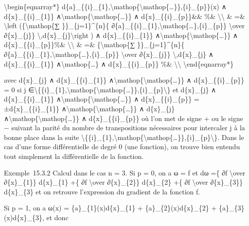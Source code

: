 \documentclass[]{article}
\begin{document}
\textbackslash{}begin\{eqnarray*\}
d\{a\}\_\{\{i\}\_\{1\},\textbackslash{}mathop\{\textbackslash{}mathop\{\ldots{}\}\},\{i\}\_\{p\}\}(x)
∧ d\{x\}\_\{\{i\}\_\{1\}\}
∧\textbackslash{}mathop\{\textbackslash{}mathop\{\ldots{}\}\} ∧
d\{x\}\_\{\{i\}\_\{p\}\}\&\& \%\& \textbackslash{}\textbackslash{} \&
=\& \textbackslash{}left (\{\textbackslash{}mathop\{∑
\}\}\_\{j=1\}\^{}\{n\}\{
∂\{a\}\_\{\{i\}\_\{1\},\textbackslash{}mathop\{\ldots{}\},\{i\}\_\{p\}\}
\textbackslash{}over ∂\{x\}\_\{j\}\}
\textbackslash{},d\{x\}\_\{j\}\textbackslash{}right ) ∧
d\{x\}\_\{\{i\}\_\{1\}\}
∧\textbackslash{}mathop\{\textbackslash{}mathop\{\ldots{}\}\} ∧
d\{x\}\_\{\{i\}\_\{p\}\}\%\& \textbackslash{}\textbackslash{} \& =\&
\{\textbackslash{}mathop\{∑ \}\}\_\{j=1\}\^{}\{n\}\{
∂\{a\}\_\{\{i\}\_\{1\},\textbackslash{}mathop\{\ldots{}\},\{i\}\_\{p\}\}
\textbackslash{}over ∂\{x\}\_\{j\}\} \textbackslash{},d\{x\}\_\{j\} ∧
d\{x\}\_\{\{i\}\_\{1\}\} ∧\textbackslash{}mathop\{\ldots{}\} ∧
d\{x\}\_\{\{i\}\_\{p\}\} \%\& \textbackslash{}\textbackslash{}
\textbackslash{}end\{eqnarray*\}

avec d\{x\}\_\{j\} ∧ d\{x\}\_\{\{i\}\_\{1\}\}
∧\textbackslash{}mathop\{\textbackslash{}mathop\{\ldots{}\}\} ∧
d\{x\}\_\{\{i\}\_\{p\}\} = 0 si j
∈\textbackslash{}\{\{i\}\_\{1\},\textbackslash{}mathop\{\textbackslash{}mathop\{\ldots{}\}\},\{i\}\_\{p\}\textbackslash{}\}
et d\{x\}\_\{j\} ∧ d\{x\}\_\{\{i\}\_\{1\}\}
∧\textbackslash{}mathop\{\textbackslash{}mathop\{\ldots{}\}\} ∧
d\{x\}\_\{\{i\}\_\{p\}\} = ±d\{x\}\_\{\{i\}\_\{1\}\}
∧\textbackslash{}mathop\{\textbackslash{}mathop\{\ldots{}\}\} ∧
d\{x\}\_\{j\}
∧\textbackslash{}mathop\{\textbackslash{}mathop\{\ldots{}\}\} ∧
d\{x\}\_\{\{i\}\_\{p\}\} où l'on met de signe + ou le signe − suivant la
parité du nombre de transpositions nécessaires pour intercaler j à la
bonne place dans la suite
\textbackslash{}\{\{i\}\_\{1\},\textbackslash{}mathop\{\textbackslash{}mathop\{\ldots{}\}\},\{i\}\_\{p\}\textbackslash{}\}.
Dans le cas d'une forme différentielle de degré 0 (une fonction), on
trouve bien entendu tout simplement la différentielle de la fonction.

Exemple~15.3.2 Calcul dans le cas n = 3. Si p = 0, on a ω = f et dω =\{
∂f \textbackslash{}over ∂\{x\}\_\{1\}\} d\{x\}\_\{1\} +\{ ∂f
\textbackslash{}over ∂\{x\}\_\{2\}\} d\{x\}\_\{2\} +\{ ∂f
\textbackslash{}over ∂\{x\}\_\{3\}\} d\{x\}\_\{3\} et on retrouve
l'expression du gradient de la fonction f.

Si p = 1, on a ω(x) = \{a\}\_\{1\}(x)d\{x\}\_\{1\} +
\{a\}\_\{2\}(x)d\{x\}\_\{2\} + \{a\}\_\{3\}(x)d\{x\}\_\{3\}, et donc
\end{document}
